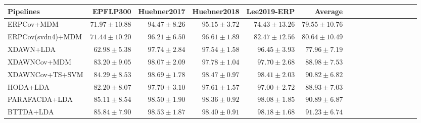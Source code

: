 \begin{tabular}{@{}lrrrrrrrrrrrrrrr@{}}
\midrule 
Pipelines & EPFLP300 & Huebner2017 & Huebner2018 & Lee2019-ERP & Average \\
\midrule
ERPCov+MDM & $71.97\pm10.88$ & $94.47\pm8.26$ & $95.15\pm3.72$ & $74.43\pm13.26$ & $79.55\pm10.76$ \\
ERPCov(svdn4)+MDM & $71.44\pm10.20$ & $96.21\pm6.50$ & $96.61\pm1.89$ & $82.47\pm12.56$ & $80.64\pm10.49$ \\
XDAWN+LDA & $62.98\pm5.38$ & $97.74\pm2.84$ & $97.54\pm1.58$ & $96.45\pm3.93$ & $77.96\pm7.19$ \\
XDAWNCov+MDM & $83.20\pm9.05$ & $98.07\pm2.09$ & $97.78\pm1.04$ & $97.70\pm2.68$ & $88.98\pm7.53$ \\
XDAWNCov+TS+SVM & $84.29\pm8.53$ & \boldmath$98.69\pm1.78$ & \boldmath$98.47\pm0.97$ & \boldmath$98.41\pm2.03$ & $90.82\pm6.82$ \\HODA+LDA & $82.20\pm8.07$ & $97.70\pm3.10$ & $97.61\pm1.57$ & $97.00\pm2.72$ & $88.93\pm7.03$ \\
PARAFACDA+LDA & $85.11\pm8.54$ & $98.50\pm1.90$ & $98.36\pm0.92$ & $98.08\pm1.85$ & $90.89\pm6.87$ \\
BTTDA+LDA & \boldmath$85.84\pm7.90$ & $98.53\pm1.87$ & $98.40\pm0.91$ & $98.18\pm1.68$ & \boldmath$91.23\pm6.74$ \\
\bottomrule
\end{tabular}


